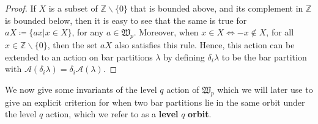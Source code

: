 \documentclass[10pt]{amsart}
\begin{document}
\begin{proof}
If $X$ is a subset of $\mathbb{Z}\backslash\{0\}$ that is bounded above, and its complement in $\mathbb{Z}$ is bounded below, then it is easy to see that the same is true for $aX\coloneqq\{ax|x\in X\}$, for any $a\in\mathfrak{W}_p$. Moreover, when $x\in X\Leftrightarrow-x\not\in X$, for all $x\in\mathbb{Z}\backslash\{0\}$, then the set $aX$ also satisfies this rule. 
Hence, this action can be extended to an action on bar partitions $\lambda$ by defining $\delta_i\lambda$ to be the bar partition with $\mathcal{A}(\delta_i\lambda)=\delta_i\mathcal{A}(\lambda)$.
\end{proof}


We now give some invariants of the level $q$ action of $\mathfrak{W}_p$ which we will later use to give an explicit criterion for when two bar partitions lie in the same orbit under the level $q$ action, which we refer to as a \textbf{level} $q$ \textbf{orbit}.
\end{document}
